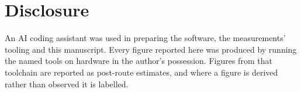 \section*{Disclosure}

An AI coding assistant was used in preparing the software, the measurements'
tooling and this manuscript. Every figure reported here was produced by running
the named tools on hardware in the author's possession. Figures from that
toolchain are reported as post-route estimates, and where a figure is derived rather than observed it is
labelled.


